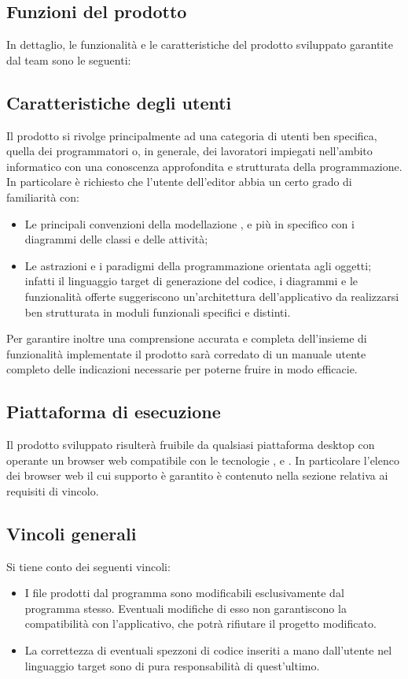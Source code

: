 	\subsection{Funzioni del prodotto}
	In dettaglio, le funzionalità e le caratteristiche del prodotto sviluppato garantite dal team \hx{} sono le seguenti:
	\subsection{Caratteristiche degli utenti}
	Il prodotto \proj{} si rivolge principalmente ad una categoria di utenti ben specifica, quella dei programmatori o, in generale, dei lavoratori impiegati nell'ambito informatico con una conoscenza approfondita e strutturata della programmazione.
	\\In particolare è richiesto che l'utente dell'editor abbia un certo grado di familiarità con:
		\begin{itemize}
			\item Le principali convenzioni della modellazione , e più in specifico con i diagrammi delle classi e delle attività;
			\item Le astrazioni e i paradigmi della programmazione orientata agli oggetti; infatti il linguaggio target di generazione del codice, i diagrammi e le funzionalità offerte suggeriscono un'architettura dell'applicativo da realizzarsi ben strutturata in moduli funzionali specifici e distinti.
		\end{itemize} 
	Per garantire inoltre una comprensione accurata e completa dell'insieme di funzionalità implementate il prodotto sarà corredato di un manuale utente completo delle indicazioni necessarie per poterne fruire in modo efficacie.
	\subsection{Piattaforma di esecuzione}
	Il prodotto sviluppato risulterà fruibile da qualsiasi piattaforma desktop con operante un browser web compatibile con le tecnologie ,  e . In particolare l'elenco dei browser web il cui supporto è garantito è contenuto nella sezione relativa ai requisiti di vincolo.
\subsection{Vincoli generali}
    Si tiene conto dei seguenti vincoli:
    
    \begin{itemize}
    \item I file prodotti dal programma sono modificabili esclusivamente dal programma stesso. Eventuali modifiche di esso non garantiscono la compatibilità con l'applicativo, che potrà rifiutare il progetto modificato.
    \item La correttezza di eventuali spezzoni di codice inseriti a mano dall'utente nel linguaggio target sono di pura responsabilità di quest'ultimo.
    \end{itemize}	
	
